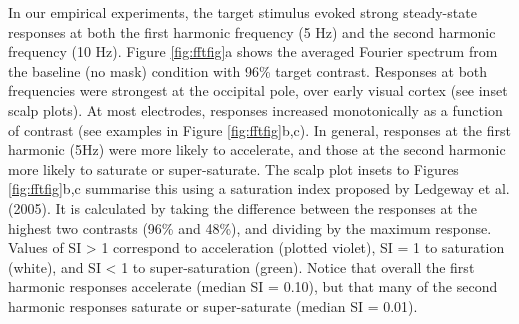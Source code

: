 \documentclass[]{article}
\begin{document}
In our empirical experiments, the target stimulus evoked strong steady-state responses at both the first harmonic frequency (5 Hz) and the second harmonic frequency (10 Hz). Figure \ref{fig:fftfig}a shows the averaged Fourier spectrum from the baseline (no mask) condition with 96\% target contrast. Responses at both frequencies were strongest at the occipital pole, over early visual cortex (see inset scalp plots). At most electrodes, responses increased monotonically as a function of contrast (see examples in Figure \ref{fig:fftfig}b,c). In general, responses at the first harmonic (5Hz) were more likely to accelerate, and those at the second harmonic more likely to saturate or super-saturate. The scalp plot insets to Figures \ref{fig:fftfig}b,c summarise this using a saturation index proposed by Ledgeway et al. (2005). It is calculated by taking the difference between the responses at the highest two contrasts (96\% and 48\%), and dividing by the maximum response. Values of SI \textgreater{} 1 correspond to acceleration (plotted violet), SI = 1 to saturation (white), and SI \textless{} 1 to super-saturation (green). Notice that overall the first harmonic responses accelerate (median SI = 0.10), but that many of the second harmonic responses saturate or super-saturate (median SI = 0.01).
\end{document}
